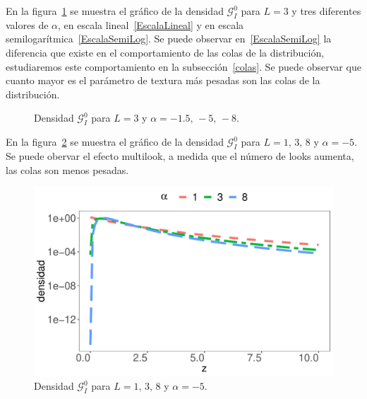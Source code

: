 En la figura~\ref{DensidadGI0L03} se muestra el gráfico de la densidad $\mathcal{G}_I^0$ para $L=3$ y tres diferentes valores de $\alpha$, en escala lineal~\ref{EscalaLineal} y en escala semilogarítmica~\ref{EscalaSemiLog}. Se puede observar en~\ref{EscalaSemiLog} la diferencia que existe en el comportamiento de las colas de la distribución, estudiaremos este comportamiento en la subsección~\ref{colas}. Se puede observar que cuanto mayor es el parámetro de textura más pesadas son las colas de la distribución.

\begin{figure}[hbt]
	\centering    
	\caption{\label{DensidadGI0L03}Densidad $\mathcal{G}_I^0$ para $L=3$ y $\alpha=-1.5, \, -5, \, -8$.}
\end{figure} 

En la figura~\ref{DensidadGI0TodoL} se muestra el gráfico de la densidad $\mathcal{G}_I^0$ para $L=1, \, 3, \, 8$ y $\alpha= -5$. Se puede obervar el efecto multilook, a medida que el número de looks aumenta, las colas son menos pesadas.

\begin{figure}[hbt]
	\centering    
	\includegraphics[width=.5\linewidth]{../../Figures/Tesis/Capitulo4/DensGI0_TodoL_Semilog.pdf}
	\caption{\label{DensidadGI0TodoL}Densidad $\mathcal{G}_I^0$ para $L=1, \, 3, \, 8$ y $\alpha= -5$.}
\end{figure} 

